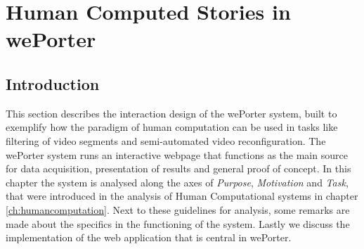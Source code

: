 \chapter{Human Computed Stories in wePorter}
\label{chap:weporter}



% 
% 
% 
% 

\section{Introduction}
This section describes the interaction design of the wePorter system, built to exemplify how the paradigm of human computation can be used in tasks like filtering of video segments and semi-automated video reconfiguration. The wePorter system runs an interactive webpage that functions as the main source for data acquisition, presentation of results and general proof of concept. In this chapter the system is analysed along the axes of \textit{Purpose}, \textit{Motivation} and \textit{Task}, that were introduced in the analysis of Human Computational systems in chapter \ref{ch:humancomputation}. Next to these guidelines for analysis, some remarks are made about the specifics in the functioning of the system. Lastly we discuss the implementation of the web application that is central in wePorter.

